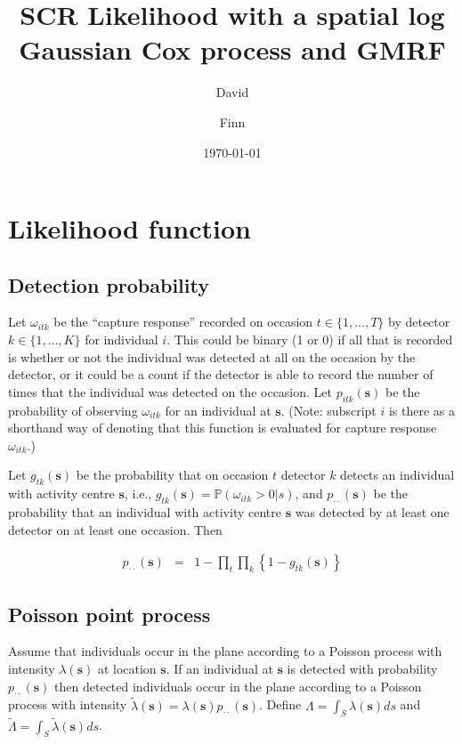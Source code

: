 \documentclass[a4paper]{article}
\title{SCR Likelihood with a spatial log Gaussian Cox process and GMRF}
\author{David \and Finn}
\date{\today}
\begin{document}
\maketitle


\section{Likelihood function}

\subsection{Detection probability}
\label{sec:detprob}

Let $\omega_{itk}$ be the ``capture response'' recorded on occasion $t\in\{1,\ldots,T\}$ by detector $k\in\{1,\ldots,K\}$ for individual $i$. This could be binary (1 or 0) if all that is recorded is whether or not the individual was detected at all on the occasion by the detector, or it could be a count if the detector is able to record the number of times that the individual was detected on the occasion. Let $p_{itk}(\boldsymbol{s})$ be the probability of observing $\omega_{itk}$ for an individual at $\boldsymbol{s}$. (Note: subscript $i$ is there as a shorthand way of denoting that this function is evaluated for capture response $\omega_{itk}$.)

Let $g_{tk}(\boldsymbol{s})$ be the probability that on occasion $t$ detector $k$ detects an individual with activity centre $\boldsymbol{s}$, i.e., $g_{tk}(\boldsymbol{s})=\mathbb{P}(\omega_{itk}>0|s)$, and $p_{\cdot\cdot}(\boldsymbol{s})$ be the probability that an individual with activity centre $\boldsymbol{s}$ was detected by at least one detector on at least one occasion. Then

\begin{eqnarray}
p_{\cdot\cdot}(\boldsymbol{s})&=&1-\prod_t\prod_k\left\{1-g_{tk}(\boldsymbol{s})\right\}
\end{eqnarray}


\subsection{Poisson point process}

Assume that individuals occur in the plane according to a Poisson process with intensity $\lambda(\boldsymbol{s})$ at location $\boldsymbol{s}$. If an individual at $\boldsymbol{s}$ is detected with probability $p_{\cdot\cdot}(\boldsymbol{s})$ then detected individuals occur in the plane according to a Poisson process with intensity  $\tilde{\lambda}(\boldsymbol{s})=\lambda(\boldsymbol{s})p_{\cdot\cdot}(\boldsymbol{s})$. Define $\Lambda=\int_S\lambda(\boldsymbol{s}) ds$ and $\tilde{\Lambda}=\int_S\tilde{\lambda}(\boldsymbol{s}) ds$.
\end{document}
